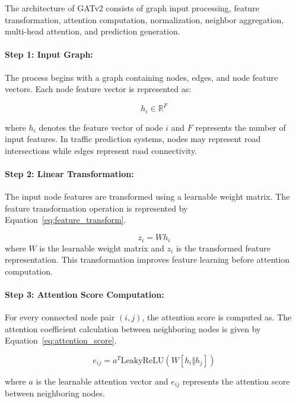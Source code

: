 The architecture of GATv2 consists of graph input processing, feature transformation, attention computation, normalization, neighbor aggregation, multi-head attention, and prediction generation.

\paragraph{Step 1: Input Graph:}

The process begins with a graph containing nodes, edges, and node feature vectors. Each node feature vector is represented as:

\[
h_i \in \mathbb{R}^{F}
\]

where \(h_i\) denotes the feature vector of node \(i\) and \(F\) represents the number of input features. In traffic prediction systems, nodes may represent road intersections while edges represent road connectivity.

\paragraph{Step 2: Linear Transformation:}

The input node features are transformed using a learnable weight matrix. The feature transformation operation is represented by Equation~\eqref{eq:feature_transform}.

\begin{equation}
z_i = Wh_i
\label{eq:feature_transform}
\end{equation}
where \(W\) is the learnable weight matrix and \(z_i\) is the transformed feature representation. This transformation improves feature learning before attention computation.

\paragraph{Step 3: Attention Score Computation:}

For every connected node pair \((i,j)\), the attention score is computed as. The attention coefficient calculation between neighboring nodes is given by Equation~\eqref{eq:attention_score}.

\begin{equation}
e_{ij}=a^{T}\text{LeakyReLU}\left(W[h_i \Vert h_j]\right)
\label{eq:attention_score}
\end{equation}

where \(a\) is the learnable attention vector and \(e_{ij}\) represents the attention score between neighboring nodes.

